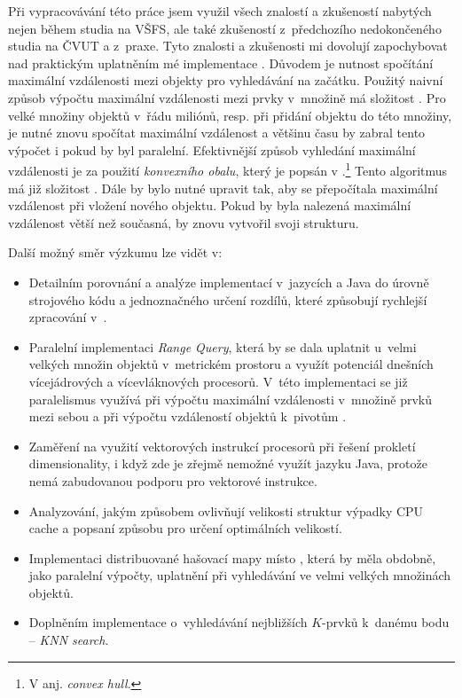 Při vypracovávání této práce jsem využil všech znalostí a zkušeností nabytých nejen během studia na VŠFS, ale také zkušeností z~předchozího nedokončeného studia na ČVUT a z~praxe.
Tyto znalosti a zkušenosti mi dovolují zapochybovat nad praktickým uplatněním mé implementace .
Důvodem je nutnost spočítání maximální vzdálenosti mezi objekty pro vyhledávání na začátku.
Použitý naivní způsob výpočtu maximální vzdálenosti mezi prvky v~množině má složitost .
Pro velké množiny objektů v~řádu miliónů, resp. při přidání objektu do této množiny, je nutné znovu spočítat maximální vzdálenost a většinu času by zabral tento výpočet i pokud by byl paralelní.
Efektivnější způsob vyhledání maximální vzdálenosti je za použití \emph{konvexního obalu}, který je popsán v \cite{Cormen:2001:IA:580470}.\footnote{V anj. \emph{convex hull}.}
Tento algoritmus má již složitost .
Dále by bylo nutné upravit \MIndex{} tak, aby se přepočítala maximální vzdálenost při vložení nového objektu.
Pokud by byla nalezená maximální vzdálenost větší než současná, \MIndex{} by znovu vytvořil svoji strukturu.

Další možný směr výzkumu  lze vidět v:
\begin{itemize}
\item Detailním porovnání a analýze implementací v~jazycích \CC{} a Java do úrovně strojového kódu a jednoznačného určení rozdílů, které způsobují rychlejší zpracování v~\CC{}.
\item Paralelní implementaci \emph{Range Query}, která by se dala uplatnit u~velmi velkých množin objektů v~metrickém prostoru a využít potenciál dnešních vícejádrových a vícevláknových procesorů.
V~této implementaci se již paralelismus využívá při výpočtu maximální vzdálenosti v~množině prvků mezi sebou a při výpočtu vzdáleností objektů k~pivotům .
\item Zaměření na využití vektorových instrukcí procesorů při řešení prokletí dimensionality, i když zde je zřejmě nemožné využít jazyku Java, protože nemá zabudovanou podporu pro vektorové instrukce.
\item Analyzování, jakým způsobem ovlivňují velikosti struktur výpadky CPU cache a popsaní způsobu pro určení optimálních velikostí.
\item Implementaci distribuované hašovací mapy místo \BPTree{}, která by měla obdobně, jako paralelní výpočty, uplatnění při vyhledávání ve velmi velkých množinách objektů.
\item Doplněním implementace o~vyhledávání nejbližších $K$-prvků k~danému bodu -- \emph{KNN search}.
 \end{itemize}
